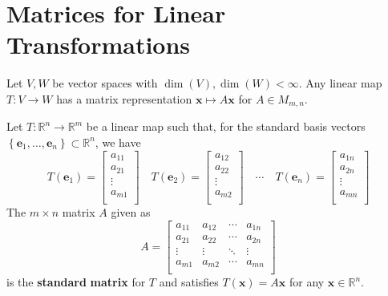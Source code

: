 \section{Matrices for Linear Transformations}
\begin{theorem}
    Let \(V,W\) be vector spaces with \(\dim (V),\dim (W)<\infty\). Any linear map \(T:V\to W\) has a matrix representation \(\mathbf{x} \mapsto A \mathbf{x} \) for \(A\in M_{m,n}\).
\end{theorem}
\begin{theorem}
    Let \(T:\mathbb{R} ^n\to \mathbb{R} ^m\) be a linear map such that, for the standard basis vectors \(\left\{ \mathbf{e}_1,\ldots,\mathbf{e} _n \right\} \subset \mathbb{R} ^n \), we have 
    \[
        T\left( \mathbf{e} _1 \right) = \begin{bmatrix}
             a_{11}  \\
             a_{21}  \\
              \vdots\\
              a_{m1} \\
        \end{bmatrix}\quad T\left( \mathbf{e} _2 \right) = \begin{bmatrix}
            a_{12}  \\
            a_{22}  \\
             \vdots\\
             a_{m2} \\
       \end{bmatrix}\quad \cdots\quad T\left( \mathbf{e} _n \right) = \begin{bmatrix}
        a_{1n}  \\
        a_{2n}  \\
         \vdots\\
         a_{mn} \\
   \end{bmatrix}
    \]
    The \(m\times n\) matrix \(A\) given as 
    \[
        A=\begin{bmatrix}
            a_{11}  &a_{12}   &\cdots  &a_{1n}    \\
             a_{21} &a_{22}   &\cdots  &a_{2n}    \\
             \vdots&\vdots  &\ddots  &\vdots   \\
             a_{m1} &a_{m2}   &\cdots  &a_{mn}    \\
        \end{bmatrix}
    \]
    is the \textbf{standard} \textbf{matrix} for \(T\) and satisfies \(T(\mathbf{x} )=A \mathbf{x} \) for any \(\mathbf{x} \in \mathbb{R} ^n\).
\end{theorem}

